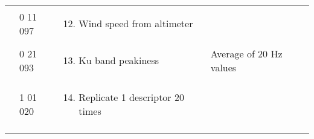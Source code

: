 \begin{longtable}[]{@{}llll@{}}
\begin{minipage}[t]{0.22\columnwidth}\raggedright
\strut
\end{minipage} & \begin{minipage}[t]{0.22\columnwidth}\raggedright
0 11 097\strut
\end{minipage} & \begin{minipage}[t]{0.22\columnwidth}\raggedright
\begin{enumerate}
\setcounter{enumi}{11}
\item
  Wind speed from altimeter
\end{enumerate}\strut
\end{minipage} & \begin{minipage}[t]{0.22\columnwidth}\raggedright
\strut
\end{minipage}\tabularnewline
\begin{minipage}[t]{0.22\columnwidth}\raggedright
\strut
\end{minipage} & \begin{minipage}[t]{0.22\columnwidth}\raggedright
0 21 093\strut
\end{minipage} & \begin{minipage}[t]{0.22\columnwidth}\raggedright
\begin{enumerate}
\setcounter{enumi}{12}
\item
  Ku band peakiness
\end{enumerate}\strut
\end{minipage} & \begin{minipage}[t]{0.22\columnwidth}\raggedright
Average of 20 Hz values\strut
\end{minipage}\tabularnewline
\begin{minipage}[t]{0.22\columnwidth}\raggedright
\strut
\end{minipage} & \begin{minipage}[t]{0.22\columnwidth}\raggedright
1 01 020\strut
\end{minipage} & \begin{minipage}[t]{0.22\columnwidth}\raggedright
\begin{enumerate}
\setcounter{enumi}{13}
\item
  Replicate 1 descriptor 20 times
\end{enumerate}\strut
\end{minipage} & \begin{minipage}[t]{0.22\columnwidth}\raggedright
\strut
\end{minipage}\tabularnewline
\begin{minipage}[t]{0.22\columnwidth}\raggedright

\end{minipage}
\end{longtable}
